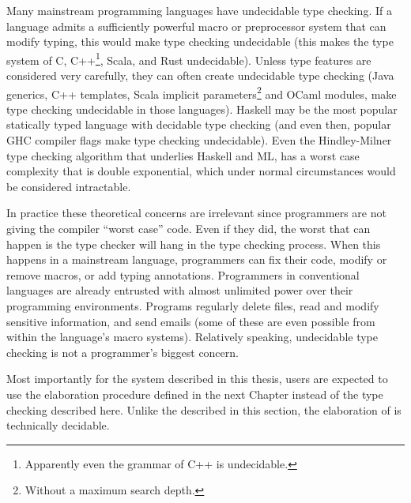  
Many mainstream programming languages have undecidable type checking.
If a language admits a sufficiently powerful macro or preprocessor system that can modify typing, this would make type checking undecidable (this makes the type system of C, C++\footnote{
  Apparently even the grammar of C++ is undecidable.
}, Scala, and Rust undecidable).
Unless type features are considered very carefully, they can often create undecidable type checking (Java generics, C++ templates, Scala implicit parameters\footnote{
  Without a maximum search depth.
} and OCaml modules, make type checking undecidable in those languages).
Haskell may be the most popular statically typed language with decidable type checking (and even then, popular GHC compiler flags make type checking undecidable).
Even the Hindley-Milner type checking algorithm that underlies Haskell and ML, has a worst case complexity that is double exponential, which under normal circumstances would be considered intractable.
 
In practice these theoretical concerns are irrelevant since programmers are not giving the compiler ``worst case'' code.
Even if they did, the worst that can happen is the type checker will hang in the type checking process.
When this happens in a mainstream language, programmers can fix their code, modify or remove macros, or add typing annotations.
Programmers in conventional languages are already entrusted with almost unlimited power over their programming environments.
Programs regularly delete files, read and modify sensitive information, and send emails (some of these are even possible from within the language's macro systems).
Relatively speaking, undecidable type checking is not a programmer's biggest concern.
 
Most importantly for the system described in this thesis, users are expected to use the elaboration procedure defined in the next Chapter instead of the \bidir{} type checking described here.
Unlike the \bidir{} described in this section, the elaboration of  is technically decidable.

